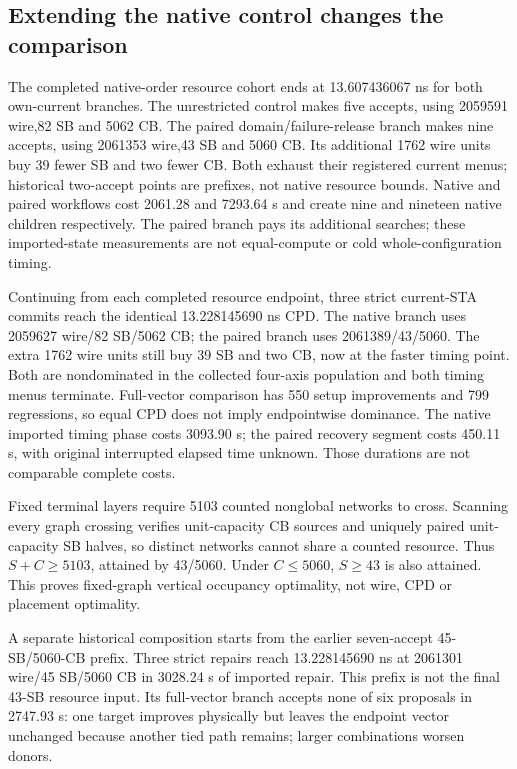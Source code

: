 \documentclass[conference,10pt]{IEEEtran}
\begin{document}
\subsection{Extending the native control changes the comparison}
The completed native-order resource cohort ends at 13.607436067 ns for both own-current branches. The unrestricted control makes five accepts, using 2059591 wire,82 SB and 5062 CB. The paired domain/failure-release branch makes nine accepts, using 2061353 wire,43 SB and 5060 CB. Its additional 1762 wire units buy 39 fewer SB and two fewer CB. Both exhaust their registered current menus; historical two-accept points are prefixes, not native resource bounds. Native and paired workflows cost 2061.28 and 7293.64 s and create nine and nineteen native children respectively. The paired branch pays its additional searches; these imported-state measurements are not equal-compute or cold whole-configuration timing.

Continuing from each completed resource endpoint, three strict current-STA commits reach the identical 13.228145690 ns CPD. The native branch uses 2059627 wire/82 SB/5062 CB; the paired branch uses 2061389/43/5060. The extra 1762 wire units still buy 39 SB and two CB, now at the faster timing point. Both are nondominated in the collected four-axis population and both timing menus terminate. Full-vector comparison has 550 setup improvements and 799 regressions, so equal CPD does not imply endpointwise dominance. The native imported timing phase costs 3093.90 s; the paired recovery segment costs 450.11 s, with original interrupted elapsed time unknown. Those durations are not comparable complete costs.

Fixed terminal layers require 5103 counted nonglobal networks to cross. Scanning every graph crossing verifies unit-capacity CB sources and uniquely paired unit-capacity SB halves, so distinct networks cannot share a counted resource. Thus $S+C\ge5103$, attained by 43/5060. Under $C\le5060$, $S\ge43$ is also attained. This proves fixed-graph vertical occupancy optimality, not wire, CPD or placement optimality.

A separate historical composition starts from the earlier seven-accept 45-SB/5060-CB prefix. Three strict repairs reach 13.228145690 ns at 2061301 wire/45 SB/5060 CB in 3028.24 s of imported repair. This prefix is not the final 43-SB resource input. Its full-vector branch accepts none of six proposals in 2747.93 s: one target improves physically but leaves the endpoint vector unchanged because another tied path remains; larger combinations worsen donors.
\end{document}
